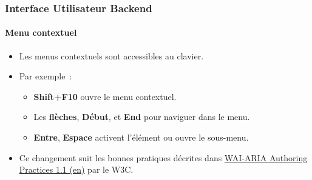 %

\begin{frame}[fragile]
	\frametitle{Interface Utilisateur Backend}
	\framesubtitle{Menu contextuel}

	\begin{itemize}
		\item Les menus contextuels sont accessibles au clavier.
		\item Par exemple~:

			\begin{itemize}\small
				\item \textbf{Shift+F10} ouvre le menu contextuel.
				\item Les \textbf{flèches}, \textbf{Début}, et \textbf{End} pour naviguer dans le menu.
				\item \textbf{Entre}, \textbf{Espace} activent l'élément ou ouvre le sous-menu.
			\end{itemize}

		\item Ce changement suit les bonnes pratiques décrites dans
			\href{https://www.w3.org/TR/wai-aria-practices-1.1/#keyboard-interaction-12}{WAI-ARIA Authoring Practices 1.1 (en)}
			par le W3C.

	\end{itemize}

\end{frame}

